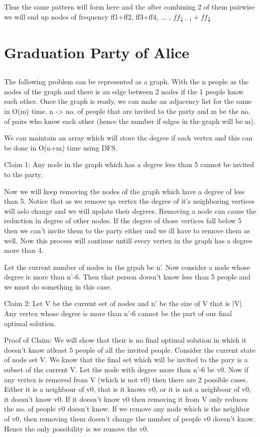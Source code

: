 \documentclass{article}
\begin{document}
Thus the same pattern will form here and the after combining 2 of them pairwise we will end up nodes of frequency ff1+ff2, ff3+ff4, ... , $ff_{\frac{n}{4}-1}+ff_{\frac{n}{4}}$

\section{Graduation Party of Alice}

\subsection{}
The following problem can be represented as a graph. With the n people as the nodes of the graph and there is an edge between 2 nodes if the 1 people know each other. Once the graph is ready, we can make an adjacency list for the same in O(m) time. n -> no. of people that are invited to the party and m be the no. of pairs who know each other (hence the number if edges in the graph will be m).

We can maintain an array which will store the degree if each vertex and this can be done in O(n+m) time using DFS.

Claim 1: Any node in the graph which has a degree less than 5 cannot be invited to the party. 

Now we will keep removing the nodes of the graph which have a degree of less than 5. Notice that as we remove qa vertex the degree of it's neighboring vertices will aslo change and we will update their degrees. Removing a node can cause the reduction in degree of other nodes. If the degree of those vertices fall below 5 then we can't invite them to the party either and we ill have to remove them as well. Now this process will continue untill every vertex in the graph has a degree more than 4.

Let the current number of nodes in the grpah be n'. Now consider a node whose degree is more than n'-6. Then that person doesn't know less than 5 people and we must do something in this case. 

Claim 2: Let V be the current set of nodes and n' be the size of V that is |V|. Any vertex whose degree is more than n'-6 cannot be the part of our final optimal solution. 

Proof of Claim: We will show that their is no final optimal solution in which it doesn't know atleast 5 people of all the invited people. Consider the current state of node set V. We know that the final set which will be invited to the pary is a subset of the current V. Let the node with degree more than n'-6 be v0. Now if any vertex is removed from V (which is not v0) then there are 2 possible cases. Either it is a neighbour of v0, that is it knows v0, or it is not a neighbour of v0, it doesn't know v0. If it doesn't know v0 then removing it from V only reduces the no. of people v0 doesn't know. If we remove any node which is the neighbor of v0, then removing them doesn't change the number of people v0 doesn't know. Hence the only possibility is we remove the v0.
\end{document}
